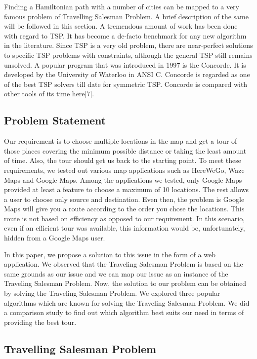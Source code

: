 \documentclass[conference]{IEEEtran}
\begin{document}
Finding a Hamiltonian path with a number of cities can be mapped to a very famous problem of Travelling Salesman Problem. A brief description of the same will be followed in this section. A tremendous amount of work has been done with regard to TSP. It has become a de-facto benchmark for any new algorithm in the literature. Since TSP is a very old problem, there are near-perfect solutions to specific TSP problems with constraints, although the general TSP still remains unsolved. A popular program that was introduced in 1997 is the Concorde. It is developed by the University of Waterloo in ANSI C. Concorde is regarded as one of the best TSP solvers till date for symmetric TSP. Concorde is compared with other tools of its time here[7].

\subsection {Problem Statement}

Our requirement is to choose multiple locations in the map and get a tour of those places covering the minimum possible distance or taking the least amount of time. Also, the tour should get us back to the starting point. To meet these requirements, we tested out various map applications such as HereWeGo, Waze Maps and Google Maps. Among the applications we tested, only Google Maps provided at least a feature to choose a maximum of 10 locations. The rest allows a user to choose only source and destination. Even then, the problem is Google Maps will give you a route according to the order you chose the locations. This route is not based on efficiency as opposed to our requirement. In this scenario, even if an efficient tour was available, this information would be, unfortunately, hidden from a Google Maps user. 

In this paper, we propose a solution to this issue in the form of a web application. We observed that the Traveling Salesman Problem is based on the same grounds as our issue and we can map our issue as an instance of the Traveling Salesman Problem. Now, the solution to our problem can be obtained by solving the Traveling Salesman Problem. We explored three popular algorithms which are known for solving the Traveling Salesman Problem. We did a comparison study to find out which algorithm best suits our need in terms of providing the best tour.


\subsection {Travelling Salesman Problem}
\end{document}
